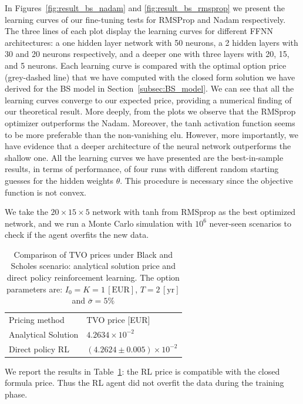 \documentclass[runningheads]{m2ef}
\begin{document}
	In Figures~\ref{fig:result_bs_nadam} and \ref{fig:result_bs_rmsprop} we present the learning curves of our fine-tuning tests for RMSProp and Nadam respectively. The three lines of each plot display the learning curves for different FFNN architectures: a one hidden layer network with 50 neurons, a 2 hidden layers with 30 and 20 neurons respectively, and a deeper one with three layers with 20, 15, and 5 neurons. Each learning curve is compared with the optimal option price (grey-dashed line) that we have computed with the closed form solution we have derived for the BS model in Section~\ref{subsec:BS_model}. We can see that all the learning curves converge to our expected price, providing a numerical finding of our theoretical result. More deeply, from the plots we observe that the RMSprop optimizer outperforms the Nadam. Moreover, the tanh activation function seems to be more preferable than the non-vanishing elu. However, more importantly, we have evidence that a deeper architecture of the neural network outperforms the shallow one. All the learning curves we have presented are the best-in-sample results, in terms of performance, of four runs with different random starting guesses for the hidden weights $\theta$. This procedure is necessary since the objective function is not convex.

	We take the $20\times 15 \times 5$ network with tanh from RMSprop as the best optimized network, and we run a Monte Carlo simulation with $10^6$ never-seen scenarios to check if the agent overfits the new data. 
	\begin{table}
	\begin{center}
	\caption{Comparison of TVO prices under Black and Scholes scenario: analytical solution price and direct policy reinforcement learning. The option parameters are: $I_0=K=1\,[\text{EUR}]$, $T=2\,[\text{yr}]$ and $\bar{\sigma}=5\%$}
	\label{tab:mc_results_bs}
	\begin{tabular}{ll}
	\hline\noalign{\smallskip}
	Pricing method & TVO price [EUR] \\
	\noalign{\smallskip}
	\hline
	\noalign{\smallskip}
	Analytical Solution & $4.2634\times 10^{-2}$ \\
	Direct policy RL & $(4.2624 \pm 0.005) \times 10^{-2}$ \\ 
	\hline
	\end{tabular}
	\end{center}
	\end{table}
	\setlength{\tabcolsep}{1.4pt}
	We report the results in Table~\ref{tab:mc_results_bs}: the RL price is compatible with the closed formula price. Thus the RL agent did not overfit the data during the training phase.
\end{document}
